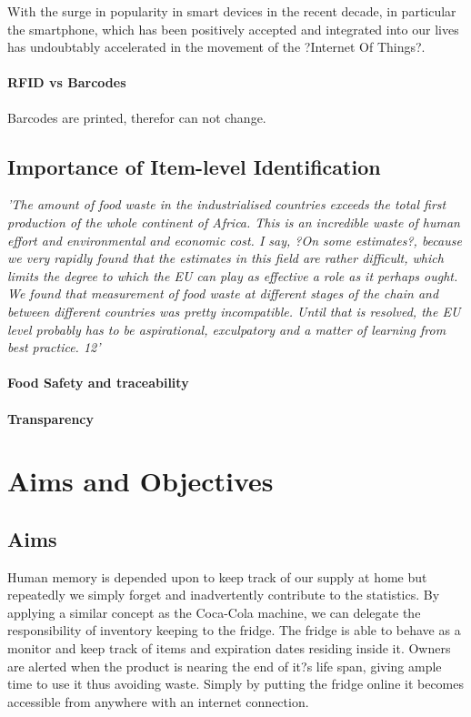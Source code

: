 \documentclass[a4paper, 11pt]{article}
\begin{document}
With the surge in popularity in smart devices in the recent decade, in particular the smartphone, which has been positively accepted and integrated into our lives has undoubtably accelerated in the movement of the ?Internet Of Things?. 

\paragraph{RFID vs Barcodes}
Barcodes are printed, therefor can not change.

\subsection{Importance of Item-level Identification}
\emph{'The amount of food waste in the industrialised countries exceeds the total first
production of the whole continent of Africa. This is an incredible waste of human effort
and environmental and economic cost. I say, ?On some estimates?, because we very
rapidly found that the estimates in this field are rather difficult, which limits the degree
to which the EU can play as effective a role as it perhaps ought. We found that
measurement of food waste at different stages of the chain and between different
countries was pretty incompatible. Until that is resolved, the EU level probably has to
be aspirational, exculpatory and a matter of learning from best practice. 12'}
\paragraph{Food Safety and traceability}
\paragraph{Transparency}

\section{Aims and Objectives}
\subsection{Aims}
Human memory is depended upon to keep track of our supply at home but repeatedly we simply forget and inadvertently contribute to the statistics. By applying a similar concept as the Coca-Cola machine, we can delegate the responsibility of inventory keeping to the fridge. The fridge is able to behave as a monitor and keep track of items and expiration dates residing inside it. Owners are alerted when the product is nearing the end of it?s life span, giving ample time to use it thus avoiding waste. Simply by putting the fridge online it becomes accessible from anywhere with an internet connection.
\end{document}
